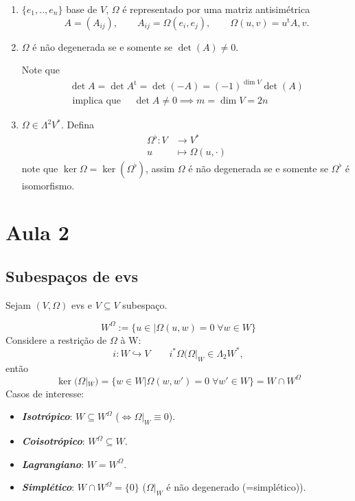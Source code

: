\begin{remark}\leavevmode 
	\begin{enumerate}
		\item $\{e_1,..,e_{n}\} $ base de $V$, $\Omega$ \'e representado por uma matriz antisim\'etrica
	\[A=(A_{ij}),\qquad A_{ij}=\Omega(e_{i},e_{j}),\qquad \Omega(u,v)=u^{\operatorname{t}} A,v.\]

	\item $\Omega$ \'e n\~ao degenerada se e somente se $\det (A)\neq 0$.

		Note que
		 \begin{align*}\det A=\det A^{\operatorname{t}} =\det (-A)=(-1)^{\dim V}\det (A)\\
			 \text{ implica que }\quad  \det A\neq 0\implies m=\dim V=2n
			 \end{align*}
	
	\item $\Omega\in \Lambda^{2} V^{*}$. Defina
		\begin{align*}
			\Omega^{\flat}: V &\longrightarrow V^{*} \\
			u &\longmapsto \Omega(u,\cdot )
		\end{align*}
		note que $\ker \Omega=\ker (\Omega^{\flat} )$, assim $\Omega$ \'e n\~ao degenerada se e somente se  $\Omega^{\flat}$ \'e isomorfismo.
	\end{enumerate}
	\end{remark}

\section{Aula 2}

\subsection{Subespa\c cos de evs}

Sejam $(V,\Omega)$ evs e $V\subseteq V$ subespa\c co.

\begin{defn}
\[W^{\Omega} :=\{u\in |\Omega(u,w)=0\;\forall w\in W\}\]
	Considere a restri\c c\~ao  de $\Omega$ \`a W:
	\[i:W\hookrightarrow V\qquad i^{*} \Omega(\Omega|_{W}\in \Lambda_2W^{*},\]
	ent\~ao
	\[\ker (\Omega|_{W})=\{w\in W |\Omega(w,w')=0\;\forall w'\in W\}=W\cap W^{\Omega}\]
Casos de interesse:
\begin{itemize}
	\item \textit{\textbf{Isotr\'opico}}: $W\subseteq W^{\Omega}$ ($\iff\Omega|_{W}\equiv 0$).
	\item \textit{\textbf{Coisotr\'opico}}: $W^{\Omega} \subseteq W$.
	\item  \textit{\textbf{Lagrangiano}}: $W=W^{\Omega}$.
	\item \textit{\textbf{Simpl\'etico}}: $W\cap W^{\Omega} =\{0\}$ ($\Omega|_{W}$ \'e n\~ao degenerado (=simpl\'etico)). 
\end{itemize}
\end{defn}

